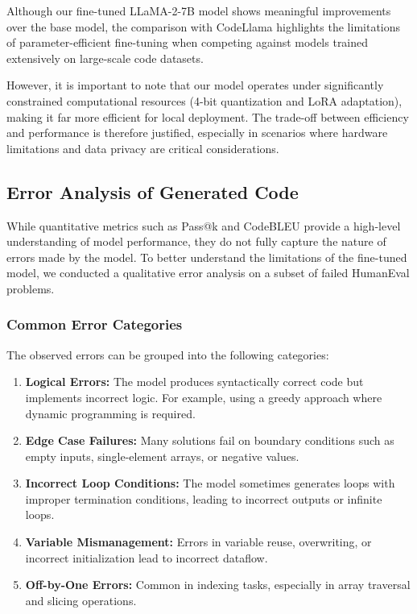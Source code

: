 Although our fine-tuned LLaMA-2-7B model shows meaningful improvements over the base model, the comparison with CodeLlama highlights the limitations of parameter-efficient fine-tuning when competing against models trained extensively on large-scale code datasets. 

However, it is important to note that our model operates under significantly constrained computational resources (4-bit quantization and LoRA adaptation), making it far more efficient for local deployment. The trade-off between efficiency and performance is therefore justified, especially in scenarios where hardware limitations and data privacy are critical considerations.

\subsection{Error Analysis of Generated Code}

While quantitative metrics such as Pass@k and CodeBLEU provide a high-level understanding of model performance, they do not fully capture the nature of errors made by the model. To better understand the limitations of the fine-tuned model, we conducted a qualitative error analysis on a subset of failed HumanEval problems.

\subsubsection{Common Error Categories}

The observed errors can be grouped into the following categories:

\begin{enumerate}
    \item \textbf{Logical Errors:} The model produces syntactically correct code but implements incorrect logic. For example, using a greedy approach where dynamic programming is required.
    
    \item \textbf{Edge Case Failures:} Many solutions fail on boundary conditions such as empty inputs, single-element arrays, or negative values.
    
    \item \textbf{Incorrect Loop Conditions:} The model sometimes generates loops with improper termination conditions, leading to incorrect outputs or infinite loops.
    
    \item \textbf{Variable Mismanagement:} Errors in variable reuse, overwriting, or incorrect initialization lead to incorrect dataflow.
    
    \item \textbf{Off-by-One Errors:} Common in indexing tasks, especially in array traversal and slicing operations.
\end{enumerate}

